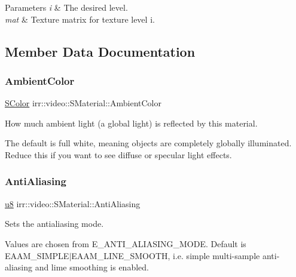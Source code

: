 \begin{DoxyParams}{Parameters}
{\em i} & The desired level. \\
\hline
{\em mat} & Texture matrix for texture level i. \\
\hline
\end{DoxyParams}


\subsection{Member Data Documentation}
\mbox{\label{classirr_1_1video_1_1SMaterial_a434c189b7c618c66f4d09118d30e6b4b}} 
\subsubsection{\texorpdfstring{Ambient\+Color}{AmbientColor}}
{\footnotesize\ttfamily \hyperlink{classirr_1_1video_1_1SColor}{S\+Color} irr\+::video\+::\+S\+Material\+::\+Ambient\+Color}



How much ambient light (a global light) is reflected by this material. 

The default is full white, meaning objects are completely globally illuminated. Reduce this if you want to see diffuse or specular light effects. \mbox{\label{classirr_1_1video_1_1SMaterial_a8f42b43ebf214c502e6758b9b608c095}} 
\subsubsection{\texorpdfstring{Anti\+Aliasing}{AntiAliasing}}
{\footnotesize\ttfamily \hyperlink{namespaceirr_a646874f69af8ff87fc10201b0254a761}{u8} irr\+::video\+::\+S\+Material\+::\+Anti\+Aliasing}



Sets the antialiasing mode. 

Values are chosen from E\+\_\+\+A\+N\+T\+I\+\_\+\+A\+L\+I\+A\+S\+I\+N\+G\+\_\+\+M\+O\+DE. Default is E\+A\+A\+M\+\_\+\+S\+I\+M\+P\+L\+E$\vert$\+E\+A\+A\+M\+\_\+\+L\+I\+N\+E\+\_\+\+S\+M\+O\+O\+TH, i.\+e. simple multi-\/sample anti-\/aliasing and lime smoothing is enabled. \mbox{\label{classirr_1_1video_1_1SMaterial_afbef5b333fd3af57649cf11ab575fa26}} 
